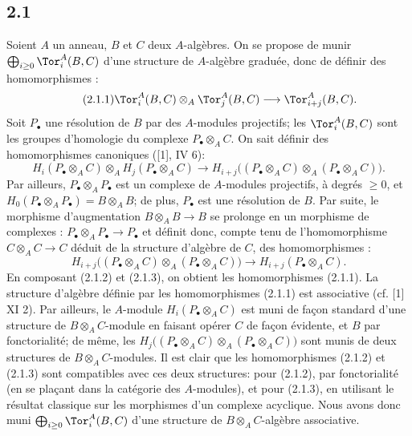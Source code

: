 \subsection*{2.1}
Soient \(A\) un anneau, \(B\) et \(C\) deux \(A\)-algèbres. On se propose de munir \(\bigoplus_{i\ge0}\Tor_i^A(B,C)\) d'une structure de \(A\)-algèbre graduée, donc de définir des homomorphismes :
\begin{equation}\tag{2.1.1}
 \Tor_i^A(B,C)\otimes_A\Tor_j^A(B,C)\longrightarrow \Tor_{i+j}^A(B,C).
\end{equation}
Soit \(P_\bullet\) une résolution de \(B\) par des \(A\)-modules projectifs; les \(\Tor_i^A(B,C)\) sont les groupes d'homologie du complexe \(P_\bullet\otimes_A C\). On sait définir des homomorphismes canoniques ([1], IV 6):
\begin{equation}\tag{2.1.2}
 H_i(P_\bullet\otimes_A C)\otimes_A H_j(P_\bullet\otimes_A C)
 \longrightarrow H_{i+j}\bigl((P_\bullet\otimes_A C)\otimes_A(P_\bullet\otimes_A C)\bigr).
\end{equation}
Par ailleurs, \(P_\bullet\otimes_A P_\bullet\) est un complexe de \(A\)-modules projectifs, à degrés \(\geq0\), et \(H_0(P_\bullet\otimes_A P_\bullet)=B\otimes_A B\); de plus, \(P_\bullet\) est une résolution de \(B\). Par suite, le morphisme d'augmentation \(B\otimes_A B\to B\) se prolonge en un morphisme de complexes : \(P_\bullet\otimes_A P_\bullet\to P_\bullet\) et définit donc, compte tenu de l'homomorphisme \(C\otimes_A C\to C\) déduit de la structure d'algèbre de \(C\), des homomorphismes :
\begin{equation}\tag{2.1.3}
 H_{i+j}\bigl((P_\bullet\otimes_A C)\otimes_A(P_\bullet\otimes_A C)\bigr)
 \longrightarrow H_{i+j}(P_\bullet\otimes_A C).
\end{equation}
En
composant (2.1.2) et (2.1.3), on obtient les homomorphismes (2.1.1). La structure d'algèbre définie par les homomorphismes (2.1.1) est associative (cf. [1] XI 2). Par ailleurs, le \(A\)-module \(H_i(P_\bullet\otimes_A C)\) est muni de façon standard d'une structure de \(B\otimes_A C\)-module en faisant opérer \(C\) de façon évidente, et \(B\) par fonctorialité; de même, les \(H_j\bigl((P_\bullet\otimes_A C)\otimes_A(P_\bullet\otimes_A C)\bigr)\) sont munis de deux structures de \(B\otimes_A C\)-modules. Il est clair que les homomorphismes (2.1.2) et (2.1.3) sont compatibles avec ces deux structures: pour (2.1.2), par fonctorialité (en se plaçant dans la catégorie des \(A\)-modules), et pour (2.1.3), en utilisant le résultat classique sur les morphismes d'un complexe acyclique. Nous avons donc muni \(\bigoplus_{i\ge0}\Tor_i^A(B,C)\) d'une structure de \(B\otimes_A C\)-algèbre associative.

